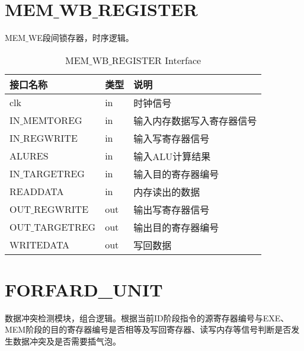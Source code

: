 \section{MEM$\_$WB$\_$REGISTER}

MEM$\_$WE段间锁存器，时序逻辑。

\begin{center}
\renewcommand{\arraystretch}{1.3}
\small
\begin{longtable}{|p{3cm}<{\centering}|p{1.4cm}<{\centering}|p{7cm}<{\centering}|}
\caption{MEM$\_$WB$\_$REGISTER Interface}
\label{tab:treatments}\\
\hline
接口名称 & 类型 & 说明 \\
\hline
clk & in & 时钟信号 \\
\hline
IN$\_$MEMTOREG & in & 输入内存数据写入寄存器信号 \\
\hline
IN$\_$REGWRITE & in & 输入写寄存器信号 \\
\hline
ALURES & in & 输入ALU计算结果 \\
\hline
IN$\_$TARGETREG & in & 输入目的寄存器编号 \\
\hline
READDATA & in & 内存读出的数据 \\
\hline
OUT$\_$REGWRITE & out & 输出写寄存器信号 \\
\hline
OUT$\_$TARGETREG & out & 输出目的寄存器编号 \\
\hline
WRITEDATA & out & 写回数据 \\
\hline
\end{longtable}
\end{center}


\section{FORFARD\_UNIT}

数据冲突检测模块，组合逻辑。根据当前ID阶段指令的源寄存器编号与EXE、MEM阶段的目的寄存器编号是否相等及写回寄存器、读写内存等信号判断是否发生数据冲突及是否需要插气泡。

